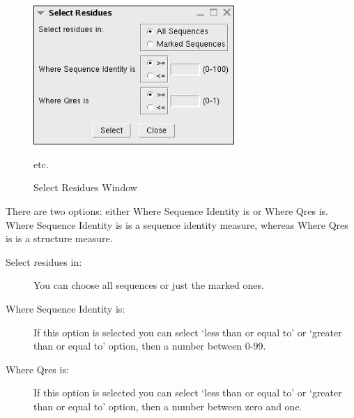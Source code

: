 \begin{description}
\begin{figure}[here]
\centerline{\includegraphics[width=3in]{./pictures/select_residues.jpg}}
\caption{Select Residues Window}%
etc.  \label{fig:select_res} \end{figure}

There are two options: either \textsf{Where
Sequence Identity is} or \textsf{Where Qres is}.  \textsf{Where Sequence
Identity is} is a sequence identity measure, whereas \textsf{Where Qres
is} is a structure measure.

\begin{description}
     \item[Select residues in:] You can choose all sequences or just the
     marked ones.
     \item[Where Sequence Identity is:] If this option is selected you
     can select `less than or equal to' or `greater than or equal to' 
     option, then a number
     between 0-99.
     \item[Where Qres is:] If this option is selected you 
     can select `less than or equal to' or `greater than or equal to' 
     option, then a number between zero and one.
\end{description}
\end{description}


